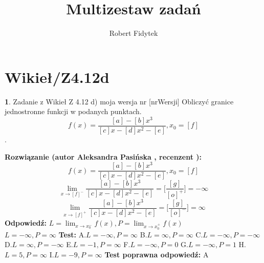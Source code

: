 \documentclass[12pt, a4paper]{article}
\title{Multizestaw zadań}
\author{Robert Fidytek}
\date{}
\theoremstyle{definition} %
\newtheorem{zad}{}
\newcommand{\kategoria}[1]{\section{#1}} %
\newcommand{\zadStart}[1]{\begin{zad}#1\newline} %
\newcommand{\zadStop}{\end{zad}}   %
\newcommand{\rozwStart}[2]{\noindent \textbf{Rozwiązanie (autor #1 , recenzent #2): }\newline} %
\newcommand{\rozwStop}{\newline}                                            %
\newcommand{\odpStart}{\noindent \textbf{Odpowiedź:}\newline}    %
\newcommand{\odpStop}{\newline}                                             %
\newcommand{\testStart}{\noindent \textbf{Test:}\newline} %
\newcommand{\testStop}{\newline} %
\newcommand{\kluczStart}{\noindent \textbf{Test poprawna odpowiedź:}\newline} %
\newcommand{\kluczStop}{\newline} %
\begin{document}
\maketitle


\kategoria{Wikieł/Z4.12d}
\zadStart{Zadanie z Wikieł Z 4.12 d) moja wersja nr [nrWersji]}
Obliczyć granice jednostronne funkcji w podanych punktach. $$f(x)=\frac{[a]-[b]x^3}{[c]x-[d]x^2-[e]},x_{0}=[f]$$.
\zadStop
\rozwStart{Aleksandra Pasińska}{}
$$f(x)=\frac{[a]-[b]x^3}{[c]x-[d]x^2-[e]},x_{0}=[f]$$
$$\lim_{x\rightarrow [f]^-}\frac{[a]-[b]x^3}{[c]x-[d]x^2-[e]}=\biggl[\frac{[g]}{[o]^+}\biggr]=-\infty$$ 
$$\lim_{x\rightarrow [f]^+}\frac{[a]-[b]x^3}{[c]x-[d]x^2-[e]}=\biggl[\frac{[g]}{[o]^-}\biggr]=\infty$$ 
\rozwStop
\odpStart
$L=\lim_{x\rightarrow x_{0}^-}f(x),P=\lim_{x\rightarrow x_{0}^+}f(x)$\\
$L=-\infty, P=\infty$
\odpStop
\testStart
A.$L=-\infty, P=\infty $
B.$L=\infty, P=\infty$
C.$L=-\infty, P=-\infty$
D.$L=\infty, P=-\infty$
E.$L=-1, P=\infty$
F.$L=-\infty, P=0$
G.$L=-\infty, P=1$
H.$L=5, P=\infty$
I.$L=-9, P=\infty$
\testStop
\kluczStart
A
\kluczStop
\end{document}
